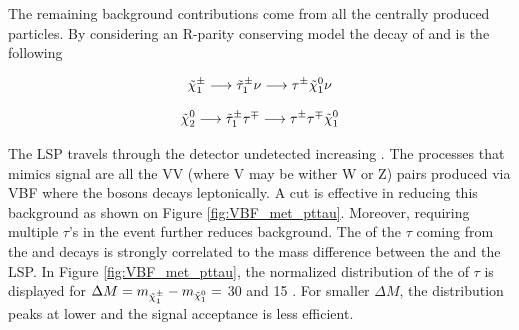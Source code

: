 The remaining background contributions come from all the centrally produced particles. By considering an R-parity conserving model the decay of \charginopm and \neutralinotwo is the following

\begin{equation}
 \tilde{\chi}^{\pm}_{1} \longrightarrow \tilde{\tau}_{1}^{\pm} \nu \longrightarrow \tau^{\pm} \tilde{\chi}^{0}_{1} \nu
\end{equation}

\begin{equation}
\tilde{\chi}^{0}_{2} \longrightarrow \tilde{\tau}_{1}^{\pm} \tau^{\mp} \longrightarrow \tau^{\pm} \tau^{\mp} \tilde{\chi}^{0}_{1}
\end{equation}

The \neutralinoone LSP travels through the detector undetected increasing \met. The processes that mimics signal are all the VV (where V may be wither W or Z) pairs produced via VBF where the bosons decays leptonically. A \met cut is eﬀective in reducing this background as shown on Figure \ref{fig:VBF_met_pttau}. Moreover, requiring multiple $\tau$’s in the event further reduces background. The \pt of the \ensuremath{\tau} coming from the \charginopm and \neutralinotwo decays is strongly correlated to the mass difference between the \charginopm and the \neutralinoone LSP. In Figure \ref{fig:VBF_met_pttau}, the normalized distribution of the \pt of \ensuremath{\tau} is displayed for \ensuremath{\Delta M = m_{\charginopm} - m_{\neutralinoone} =} 30 \gev and 15 \gev. For smaller \ensuremath{\Delta M}, the distribution peaks at lower \pt and the signal acceptance is less efficient.

